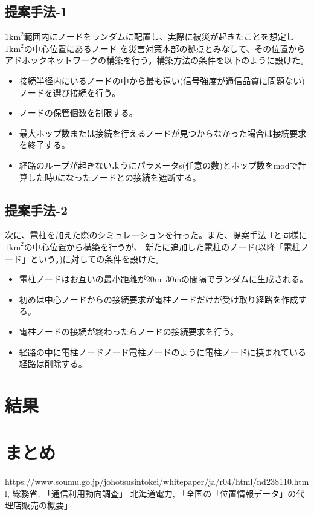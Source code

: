 \documentclass[a4paper, 9pt]{ltjsarticle}
\begin{document}
\subsection{提案手法-1}
$1\mathrm{km}^2$範囲内にノードをランダムに配置し、実際に被災が起きたことを想定し$1\mathrm{km}^2$の中心位置にあるノード
を災害対策本部の拠点とみなして、その位置からアドホックネットワークの構築を行う。構築方法の条件を以下のように設けた。
\begin{itemize}
  \item 接続半径内にいるノードの中から最も遠い(信号強度が通信品質に問題ない)ノードを選び接続を行う。
  \item ノードの保管個数を制限する。
  \item 最大ホップ数または接続を行えるノードが見つからなかった場合は接続要求を終了する。
  \item 経路のループが起きないようにパラメータs(任意の数)とホップ数をmodで計算した時0になったノードとの接続を遮断する。
\end{itemize}

\subsection{提案手法-2}
次に、電柱を加えた際のシミュレーションを行った。また、提案手法-1と同様に$1\mathrm{km}^2$の中心位置から構築を行うが、
新たに追加した電柱のノード(以降「電柱ノード」という。)に対しての条件を設けた。
\begin{itemize}
  \item 電柱ノードはお互いの最小距離が20m~30mの間隔でランダムに生成される。
  \item 初めは中心ノードからの接続要求が電柱ノードだけが受け取り経路を作成する。
  \item 電柱ノードの接続が終わったらノードの接続要求を行う。
  \item 経路の中に電柱ノード\rightarrow ノード\rightarrow 電柱ノードのように電柱ノードに挟まれている経路は削除する。
\end{itemize}

\section{結果}

\section{まとめ}

\begin{thebibliography}{9}
   https://www.soumu.go.jp/johotsusintokei/whitepaper/ja/r04/html/nd238110.html, 総務省, 「通信利用動向調査」 
   北海道電力, 「全国の「位置情報データ」の代理店販売の概要」
\end{thebibliography}
\end{document}
